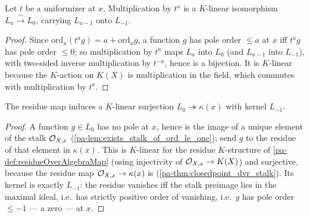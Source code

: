 \begin{theorem}
  \label{pa-thm:shiftMap}
  \leanok

  Let \(t\) be a uniformizer at \(x\). Multiplication by \(t^a\) is a \(K\)-linear isomorphism
  \(L_a \xrightarrow{\ \sim\ } L_0\), carrying \(L_{a-1}\) onto \(L_{-1}\).
\end{theorem}
\begin{proof}
  \leanok
  Since \(\mathrm{ord}_x(t^a g) = a + \mathrm{ord}_x g\), a function \(g\) has pole order \(\le a\)
  at \(x\) iff \(t^a g\) has pole order \(\le 0\); so multiplication by \(t^a\) maps \(L_a\) into
  \(L_0\) (and \(L_{a-1}\) into \(L_{-1}\)), with two-sided inverse multiplication by \(t^{-a}\),
  hence is a bijection. It is \(K\)-linear because the \(K\)-action on \(K(X)\) is multiplication in
  the field, which commutes with multiplication by \(t^a\).
\end{proof}

\begin{theorem}
  \label{pa-thm:baseHom}
  \leanok

  The residue map induces a \(K\)-linear surjection \(L_0 \twoheadrightarrow \kappa(x)\) with kernel
  \(L_{-1}\).
\end{theorem}
\begin{proof}
  \leanok
  A function \(g \in L_0\) has no pole at \(x\), hence is the image of a unique element of the stalk
  \(\mathcal{O}_{X,x}\) (\ref{pa-lem:exists_stalk_of_ord_le_one}); send \(g\) to the residue of that element
  in \(\kappa(x)\). This is \(K\)-linear for the residue \(K\)-structure of
  \ref{pa-def:residueOverAlgebraMap} (using injectivity of \(\mathcal{O}_{X,x} \to K(X)\)) and surjective,
  because the residue map \(\mathcal{O}_{X,x} \to \kappa(x)\) is (\ref{pa-thm:closedpoint_dvr_stalk}). Its
  kernel is exactly \(L_{-1}\): the residue vanishes iff the stalk preimage lies in the maximal
  ideal, i.e.\ has strictly positive order of vanishing, i.e.\ \(g\) has pole order \(\le -1\) --- a
  zero --- at \(x\).
\end{proof}

